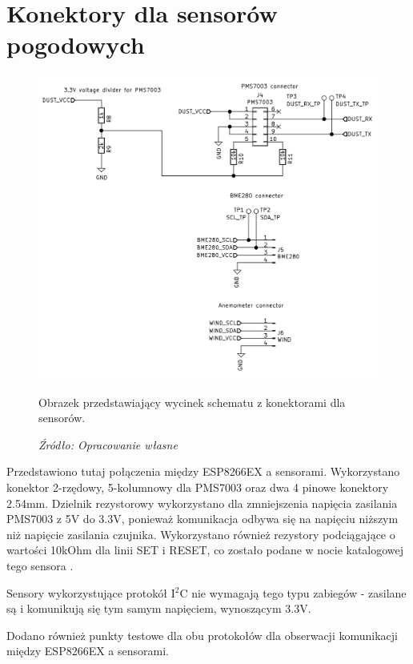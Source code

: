\documentclass[12pt,a4paper,oneside]{memoir}
\begin{document}
\section{Konektory dla sensorów pogodowych}
\begin{figure}[!h]
	\centering
	\includegraphics[scale=0.15]{images/sch/sch-06.png}
	{\tytulyrozdzialow \footnotesize \caption[Schemat - konektory dla sensorów] {Obrazek przedstawiający wycinek schematu z konektorami dla sensorów.}}
	\caption*{\textit{Źródło: Opracowanie własne}}
\end{figure}
\par Przedstawiono tutaj połączenia między ESP8266EX a sensorami. Wykorzystano konektor 2-rzędowy, 5-kolumnowy dla PMS7003 oraz dwa 4 pinowe konektory 2.54mm. Dzielnik rezystorowy wykorzystano dla zmniejszenia napięcia zasilania PMS7003 z 5V do 3.3V, ponieważ komunikacja odbywa się na napięciu niższym niż napięcie zasilania czujnika.
Wykorzystano również rezystory podciągające o wartości 10kOhm dla linii SET i RESET, co zostało podane w nocie katalogowej tego sensora \cite{pms7003datasheet}.
\par Sensory wykorzystujące protokół I$^2$C nie wymagają tego typu zabiegów - zasilane są i komunikują się tym samym napięciem, wynoszącym 3.3V.
\par Dodano również punkty testowe dla obu protokołów dla obserwacji komunikacji między ESP8266EX a sensorami.
\newpage
\end{document}
